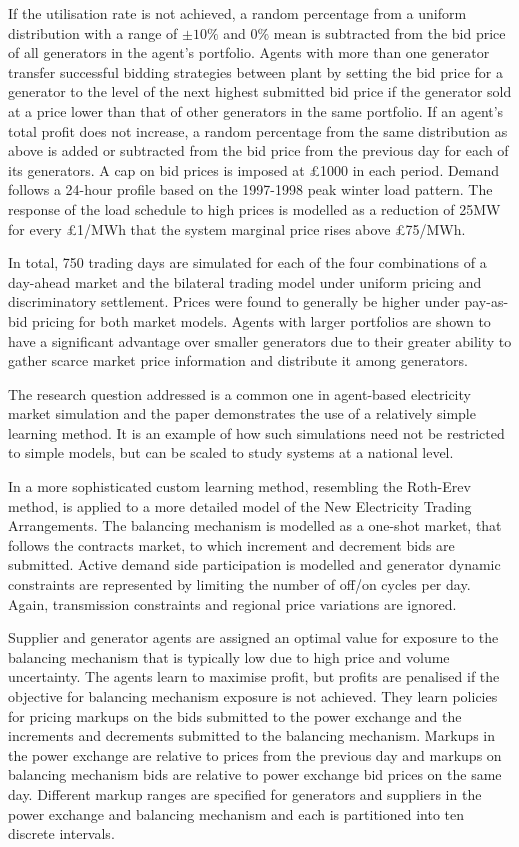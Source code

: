 If the utilisation rate is not achieved, a random percentage from a uniform
distribution with a range of $\pm10\%$ and $0\%$ mean is subtracted from the
bid price of all generators in the agent's portfolio.  Agents with more than one generator
transfer successful bidding strategies between plant by setting the
bid price for a generator to the level of the next highest submitted bid price if
the generator sold at a price lower than that of other generators in the same
portfolio.  If an agent's total profit does not increase, a random percentage
from the same distribution as above is added or subtracted from the bid price
from the previous day for each of its generators.  A cap on bid prices is
imposed at \pounds1000 in each period.  Demand follows a 24-hour profile based
on the 1997-1998 peak winter load pattern.  The response of the load schedule
to high prices is modelled as a reduction of 25MW for every \pounds1/MWh that
the system marginal price rises above \pounds75/MWh.

In total, 750 trading days are simulated for each of the four combinations of a
day-ahead market and the bilateral trading model under uniform pricing and discriminatory
settlement.  Prices were found to generally be higher under pay-as-bid pricing
for both market models.  Agents with larger portfolios are shown to have a
significant advantage over smaller generators due to their greater ability to
gather scarce market price information and distribute it among generators.

The research question addressed is a common one in agent-based electricity
market simulation and the paper demonstrates the use of a relatively simple
learning method.  It is an example of how such simulations need not be
restricted to simple models, but can be scaled to study systems at a national
level.

In  a more sophisticated custom learning method, resembling
the Roth-Erev method, is applied to a
more detailed model of the New Electricity Trading Arrangements.  The balancing
mechanism is modelled as a one-shot market, that follows the contracts market,
to which increment and decrement bids are submitted.  Active demand side
participation is modelled and generator dynamic constraints are represented by
limiting the number of off/on cycles per day.  Again, transmission constraints
and regional price variations are ignored.

Supplier and generator agents are assigned an optimal value for
exposure to the balancing mechanism that is typically low due to high price and
volume uncertainty.  The agents learn to maximise profit, but profits are
penalised if the objective for balancing mechanism exposure is not
achieved.  They learn policies for pricing markups on the bids submitted
to the power exchange and the increments and decrements submitted to the
balancing mechanism.  Markups in the power exchange are relative to prices
from the previous day and markups on balancing mechanism bids are relative to
power exchange bid prices on the same day.  Different markup
ranges are specified for generators and suppliers in the power exchange and
balancing mechanism and each is partitioned into ten discrete intervals.

